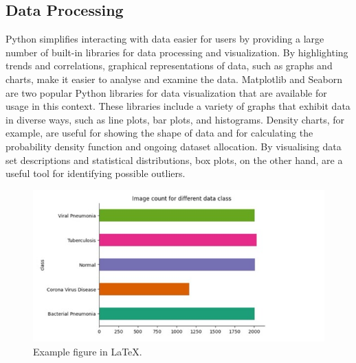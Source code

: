 \subsection{Data Processing}
Python simplifies interacting with data easier for users by providing a large number of built-in libraries for data processing and visualization. By highlighting trends and correlations, graphical representations of data, such as graphs and charts, make it easier to analyse and examine the data. Matplotlib and Seaborn are two popular Python libraries for data visualization that are available for usage in this context. These libraries include a variety of graphs that exhibit data in diverse ways, such as line plots, bar plots, and histograms. Density charts, for example, are useful for showing the shape of data and for calculating the probability density function and ongoing dataset allocation. By visualising data set descriptions and statistical distributions, box plots, on the other hand, are a useful tool for identifying possible outliers. 
\begin{figure}[ht]
    \centering
    \includegraphics[scale=0.3]{figures/graph.jpg}
    \caption{Example figure in \LaTeX.}
    \label{fig:chart_a}
\end{figure}

